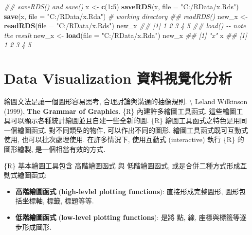 \documentclass[
]{book}
\newenvironment{Shaded}{\begin{snugshade}}{\end{snugshade}}
\newcommand{\CommentTok}[1]{\textcolor[rgb]{0.56,0.35,0.01}{\textit{#1}}}
\newcommand{\DataTypeTok}[1]{\textcolor[rgb]{0.13,0.29,0.53}{#1}}
\newcommand{\DecValTok}[1]{\textcolor[rgb]{0.00,0.00,0.81}{#1}}
\newcommand{\KeywordTok}[1]{\textcolor[rgb]{0.13,0.29,0.53}{\textbf{#1}}}
\newcommand{\NormalTok}[1]{#1}
\newcommand{\OperatorTok}[1]{\textcolor[rgb]{0.81,0.36,0.00}{\textbf{#1}}}
\newcommand{\StringTok}[1]{\textcolor[rgb]{0.31,0.60,0.02}{#1}}
\providecommand{\tightlist}{%
  \setlength{\itemsep}{0pt}\setlength{\parskip}{0pt}}
\begin{document}
\begin{Shaded}
\begin{Highlighting}[]
\CommentTok{\#\# saveRDS() and save()}
\NormalTok{x \textless{}{-}}\StringTok{ }\KeywordTok{c}\NormalTok{(}\DecValTok{1}\OperatorTok{:}\DecValTok{5}\NormalTok{)}
\KeywordTok{saveRDS}\NormalTok{(x, }\DataTypeTok{file =} \StringTok{"C:/RData/x.Rds"}\NormalTok{)}
\KeywordTok{save}\NormalTok{(x, }\DataTypeTok{file =} \StringTok{"C:/RData/x.Rda"}\NormalTok{)   }\CommentTok{\# working directory}
\CommentTok{\#\# readRDS()}
\NormalTok{new\_x \textless{}{-}}\StringTok{ }\KeywordTok{readRDS}\NormalTok{(}\DataTypeTok{file =} \StringTok{"C:/RData/x.Rds"}\NormalTok{)}
\NormalTok{new\_x}
\CommentTok{\#\# [1] 1 2 3 4 5}
\CommentTok{\#\# load() {-}{-} note the result}
\NormalTok{new\_x \textless{}{-}}\StringTok{ }\KeywordTok{load}\NormalTok{(}\DataTypeTok{file =} \StringTok{"C:/RData/x.Rda"}\NormalTok{)}
\NormalTok{new\_x}
\CommentTok{\#\# [1] "x"}
\NormalTok{x}
\CommentTok{\#\# [1] 1 2 3 4 5}
\end{Highlighting}
\end{Shaded}

\hypertarget{data-visualization-ux8cc7ux6599ux8996ux89baux5316ux5206ux6790}{%
\chapter{Data Visualization 資料視覺化分析}\label{data-visualization-ux8cc7ux6599ux8996ux89baux5316ux5206ux6790}}

繪圖文法是讓一個圖形容易思考, 合理討論與溝通的抽像規則. \textbackslash{}
Leland Wilkinson (1999),
\textbf{The Grammar of Graphics}.
\{R\} 內建許多繪圖工具函式,
這些繪圖工具可以顯示各種統計繪圖並且自建一些全新的圖.
\{R\} 繪圖工具函式之特色是用同一個繪圖函式, 對不同類型的物件,
可以作出不同的圖形.
繪圖工具函式既可互動式使用, 也可以批次處理使用.
在許多情況下, 使用互動式 (interactive)
執行 \{R\} 的圖形繪製, 是一個相當有效的方式.

\{R\} 基本繪圖工具包含 高階繪圖函式 與 低階繪圖函式, 或是合併二種方式形成互動式繪圖函式:

\begin{itemize}
\tightlist
\item
  \textbf{高階繪圖函式}
  (\textbf{high-levlel plotting functions}):
  直接形成完整圖形, 圖形包括坐標軸, 標籤, 標題等等.
\item
  \textbf{低階繪圖函式}
  (\textbf{low-level plotting functions}):
  是將 點, 線, 座標與標籤等逐步形成圖形.
\end{itemize}
\end{document}
